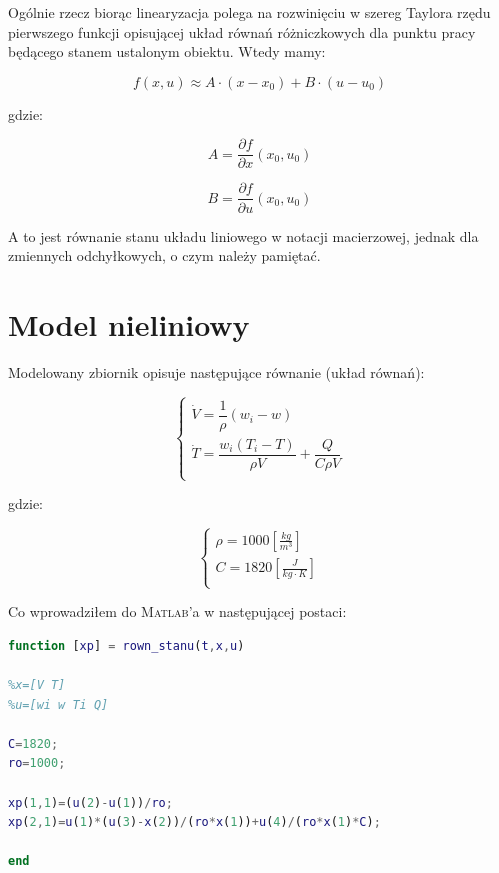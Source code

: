 \documentclass[12pt]{article}
\begin{document}
Ogólnie rzecz biorąc linearyzacja polega na rozwinięciu w szereg Taylora rzędu
pierwszego funkcji opisującej układ równań różniczkowych dla punktu pracy
będącego stanem ustalonym obiektu. Wtedy mamy:

\begin{equation}
	f(x,u)\approx A\cdot(x-x_0)+B\cdot(u-u_0)
\end{equation}

gdzie:

\begin{equation*}
	A=\frac{\partial f}{\partial x}(x_0,u_0)
\end{equation*}

\begin{equation*}
	B=\frac{\partial f}{\partial u}(x_0,u_0)
\end{equation*}

A to jest równanie stanu układu liniowego w notacji macierzowej, jednak dla
zmiennych odchyłkowych, o czym należy pamiętać.

\newpage

\section{Model nieliniowy}

Modelowany zbiornik opisuje następujące równanie (układ równań):

\begin{equation}
	\begin{cases}
		\dot{V} = \dfrac{1}{\rho}(w_i-w) \\[0.3cm]
		\dot{T} = \dfrac{w_i(T_i-T)}{\rho V} + \dfrac{Q}{C\rho V} \\
	\end{cases}
	\label{equ:rstanun}
\end{equation}

gdzie:

\begin{equation*}
	\begin{cases}
		\rho = 1000 [\frac{kg}{m^3}] \\[0.3cm]
		C = 1820 [\frac{J}{kg\cdot K}] \\
	\end{cases}
\end{equation*}

Co wprowadziłem do \textsc{Matlab}'a w następującej postaci:


\begin{lstlisting}[language=matlab]
function [xp] = rown_stanu(t,x,u)

%x=[V T]
%u=[wi w Ti Q] 

C=1820;
ro=1000;

xp(1,1)=(u(2)-u(1))/ro;
xp(2,1)=u(1)*(u(3)-x(2))/(ro*x(1))+u(4)/(ro*x(1)*C);

end
\end{lstlisting}
\end{document}
